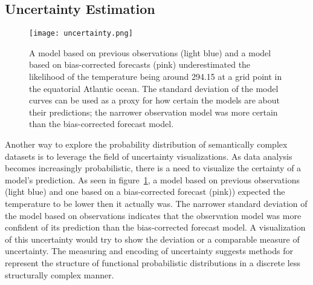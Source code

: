 \documentclass[../main.tex]{subfiles}
\begin{document}
\subsection{Uncertainty Estimation}
\label{sec:uncertainty}

\begin{figure}[H]
\texttt{[image: uncertainty.png]}
\caption{A model based on previous observations (light blue) and a model based on bias-corrected forecasts (pink) underestimated the likelihood of the temperature being around 294.15 at a grid point in the equatorial Atlantic ocean. The standard deviation of the model curves can be used as a proxy for how certain the models are about their predictions; the narrower observation model was more certain than the bias-corrected forecast model.\cite{aizenman_ensemble_2016}}
\label{fig:uncertainty}
\end{figure}

Another way to explore the probability distribution of semantically complex datasets is to leverage the field of uncertainty visualizations. As data analysis becomes increasingly probabilistic, there is a need to visualize the certainty of a model's prediction. As seen in figure~\ref{fig:uncertainty}, a model based on previous observations (light blue) and one based on a bias-corrected forecast (pink)) expected the temperature to be lower then it actually was\cite{aizenman_ensemble_2016}. The narrower standard deviation of the model based on observations indicates that the observation model was more confident of its prediction than the bias-corrected forecast model. A visualization of this uncertainty would try to show the deviation or a comparable measure of uncertainty. The measuring and encoding of uncertainty suggests methods for represent the structure of functional probabilistic distributions in a discrete less structurally complex manner. 
\end{document}

